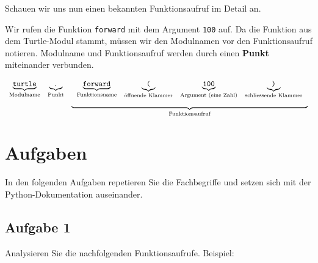 Schauen wir uns nun einen bekannten Funktionsaufruf im Detail an.

\begin{example}
\label{example-function-call}

Wir rufen die Funktion \lstinline{forward} mit dem Argument \lstinline{100} auf. Da die Funktion aus dem Turtle-Modul stammt, müssen wir den Modulnamen vor den Funktionsaufruf notieren. Modulname und Funktionsaufruf werden durch einen \textbf{Punkt} miteinander verbunden.

$$
\begin{array}[t]{ccc} 
\underbrace{\textrm{\texttt{turtle}}}_{\textrm{Modulname}} & \underbrace{\textrm{\texttt{.}}}_{\textrm{Punkt}} & 
\begin{array}[t]{cccc} 
\underbrace{\textrm{\texttt{forward}}}_{\textrm{Funktionsname}} & \underbrace{\textrm{\texttt{(}}}_{\textrm{öffnende Klammer}} &\underbrace{\textrm{\texttt{100}}}_{\textrm{Argument (eine Zahl)}} & \underbrace{\textrm{\texttt{)}}}_{\textrm{schliessende Klammer}} \end{array} \\
 &  & \underbrace{\hspace{11cm}}_{\textrm{Funktionsaufruf}}
\end{array}
$$

\end{example}

\section{Aufgaben}

In den folgenden Aufgaben repetieren Sie die Fachbegriffe und setzen sich mit der Python-Dokumentation auseinander.

\subsection{Aufgabe 1}

Analysieren Sie die nachfolgenden Funktionsaufrufe. Beispiel:

